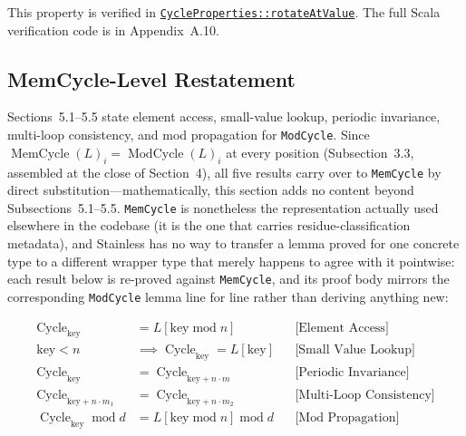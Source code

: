 This property is verified in
\href{https://github.com/thiagomata/prime-numbers/blob/cycle-article-v1.0.0/src/main/scala/v1/chapter4/cycle/properties/CycleProperties.scala}{\texttt{CycleProperties::rotateAtValue}}.
The full Scala verification code is in Appendix~A.10.

\subsection{MemCycle-Level Restatement}

Sections~5.1--5.5 state element access, small-value lookup, periodic
invariance, multi-loop consistency, and mod propagation for \texttt{ModCycle}.
Since $\operatorname{MemCycle}(L)_i=\operatorname{ModCycle}(L)_i$ at every
position (Subsection~3.3, assembled at the close of Section~4), all five
results carry over to \texttt{MemCycle} by direct substitution---mathematically,
this section adds no content beyond Subsections~5.1--5.5. \texttt{MemCycle} is
nonetheless the representation actually used elsewhere in the codebase (it is
the one that carries residue-classification metadata), and Stainless has no way
to transfer a lemma proved for one concrete type to a different wrapper type
that merely happens to agree with it pointwise: each result below is re-proved
against \texttt{MemCycle}, and its proof body mirrors the corresponding
\texttt{ModCycle} lemma line for line rather than deriving anything new:

\begin{equation*}
\begin{aligned}
\operatorname{Cycle}_{\text{key}}
  &=L[\text{key}\operatorname{mod}n] && \text{[Element Access]} \\
\text{key}<n
  &\implies \operatorname{Cycle}_{\text{key}}=L[\text{key}]
  && \text{[Small Value Lookup]} \\
\operatorname{Cycle}_{\text{key}}
  &=\operatorname{Cycle}_{\text{key}+n\cdot m}
  && \text{[Periodic Invariance]} \\
\operatorname{Cycle}_{\text{key}+n\cdot m_1}
  &=\operatorname{Cycle}_{\text{key}+n\cdot m_2}
  && \text{[Multi-Loop Consistency]} \\
\operatorname{Cycle}_{\text{key}}\operatorname{mod}d
  &=L[\text{key}\operatorname{mod}n]\operatorname{mod}d
  && \text{[Mod Propagation]}
\end{aligned}
\end{equation*}

